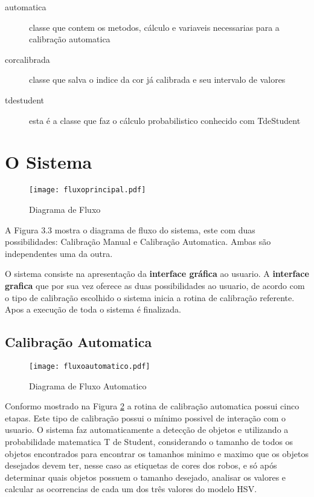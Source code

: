 \begin{description}
	
	\item [automatica] classe que contem os metodos, cálculo e variaveis necessarias para a calibração automatica
			
	\item [corcalibrada] classe que salva o indice da cor já calibrada e seu intervalo de valores
	
	\item [tdestudent] esta é a classe que faz o cálculo probabilistico conhecido com TdeStudent
	

	\end{description}

	

	\section{O Sistema}

		\begin{figure}[!h]
			\centering
			\texttt{[image: fluxoprincipal.pdf]}
			\caption{Diagrama de Fluxo}
			\label{FlowCHart}
		\end{figure}
		A Figura 3.3 mostra o diagrama de fluxo do sistema, este com duas possibilidades: Calibração Manual e Calibração Automatica. Ambas são independentes uma da outra.  
		
		 O sistema consiste na apresentação da \textbf{interface gráfica} ao usuario. A \textbf{interface grafica} que por sua vez oferece as duas possibilidades ao usuario, de acordo com o tipo de calibração escolhido o sistema inicia a rotina de calibração referente. Apos a execução de toda o sistema é finalizada.
			
	\subsection{Calibração Automatica}	
		\begin{figure}[!h]
					\centering
					\texttt{[image: fluxoautomatico.pdf]}
					\caption{Diagrama de Fluxo Automatico}
					\label{DiagramaDeFluxoAutomatico}
				\end{figure} 
		Conformo mostrado na Figura \ref{DiagramaDeFluxoAutomatico} a rotina de calibração automatica possui cinco etapas. Este tipo de calibração  possui o mínimo possivel de interação com o usuario. O sistema faz automaticamente a detecção de objetos e utilizando a probabilidade matematica T de Student, considerando o tamanho de todos os objetos encontrados para encontrar os tamanhos minimo e maximo que os objetos desejados devem ter, nesse caso as etiquetas de cores dos robos, e só após determinar quais objetos possuem o tamanho desejado, analisar os valores e calcular as ocorrencias de cada um dos três valores do modelo HSV.
			

